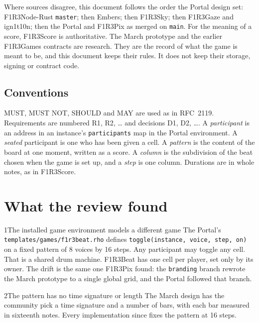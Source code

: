 \documentclass[11pt,a4paper]{article}
\newcommand{\code}[1]{\texttt{#1}}
\newcommand{\MUST}{\textsc{must}}
\newcommand{\MUSTNOT}{\textsc{must not}}
\newcommand{\SHOULD}{\textsc{should}}
\newcommand{\MAY}{\textsc{may}}
\renewcommand{\MUST}{{\fontsize{0.82em}{1em}\selectfont MUST}}
\renewcommand{\MUSTNOT}{{\fontsize{0.82em}{1em}\selectfont MUST NOT}}
\renewcommand{\SHOULD}{{\fontsize{0.82em}{1em}\selectfont SHOULD}}
\renewcommand{\MAY}{{\fontsize{0.82em}{1em}\selectfont MAY}}
\begin{document}
Where sources disagree, this document follows the order the Portal design set: F1R3Node-Rust
\code{master}; then Embers; then F1R3Sky; then F1R3Gaze and ign1t10n; then the Portal and
F1R3Pix as merged on \code{main}. For the meaning of a score, F1R3Score is authoritative. The
March prototype and the earlier F1R3Games contracts are research. They are the record of what
the game is meant to be, and this document keeps their rules. It does not keep their storage,
signing or contract code.

\subsection{Conventions}

\MUST, \MUSTNOT, \SHOULD{} and \MAY{} are used as in RFC~2119. Requirements are numbered
R1, R2, \ldots{} and decisions D1, D2, \ldots. A \emph{participant} is an address in an
instance's \code{participants} map in the Portal environment. A \emph{seated} participant is
one who has been given a cell. A \emph{pattern} is the content of the board at one moment,
written as a score. A \emph{column} is the subdivision of the beat chosen when the game is set up, and a \emph{step} is one column. Durations are in whole notes, as in
F1R3Score.

\section{What the review found}\label{sec:findings}

\begin{finding}{1}{The installed game environment models a different game}
The Portal's \code{templates/games/f1r3beat.rho} defines \code{toggle(instance, voice, step,
on)} on a fixed pattern of 8 voices by 16 steps. Any participant may toggle any cell. That is a
shared drum machine. F1R3Beat has one cell per player, set only by its owner. The drift is the
same one F1R3Pix found: the \code{branding} branch rewrote the March prototype to a single
global grid, and the Portal followed that branch.
\end{finding}

\begin{finding}{2}{The pattern has no time signature or length}
The March design has the community pick a time signature and a number of bars, with each bar
measured in sixteenth notes. Every implementation since fixes the pattern at 16 steps.
\end{finding}
\end{document}
